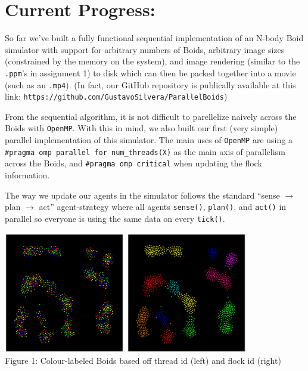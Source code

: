 \documentclass[12pt]{article}
\begin{document}
\newpage 
\section*{Current Progress:} 
\par So far we've built a fully functional sequential implementation of an N-body Boid simulator with support for arbitrary numbers of Boids, arbitrary image sizes (constrained by the memory on the system), and image rendering (similar to the \texttt{.ppm}'s in assignment 1) to disk which can then be packed together into a movie (such as an \texttt{.mp4}). (In fact, our GitHub repository is publically available at this link: \texttt{https://github.com/GustavoSilvera/ParallelBoids})
\par From the sequential algorithm, it is not difficult to parellelize naively across the Boids with \texttt{OpenMP}. With this in mind, we also built our first (very simple) parallel implementation of this simulator. The main uses of \texttt{OpenMP} are using a \texttt{\#pragma omp parallel for num\_threads(X)} as the main axis of parallelism across the Boids, and \texttt{\#pragma omp critical} when updating the flock information. 
\par The way we update our agents in the simulator follows the standard ``sense $\to$ plan $\to$ act'' agent-strategy where all agents \texttt{sense()}, \texttt{plan()}, and \texttt{act()} in parallel so everyone is using the same data on every \texttt{tick()}.
\begin{center}
    \includegraphics[width=200px]{figures/0156_procs.png}
    \includegraphics[width=200px]{figures/0156_flocks.png}\\
    Figure 1: Colour-labeled Boids based off thread id (left) and flock id (right)
\end{center}
\end{document}
